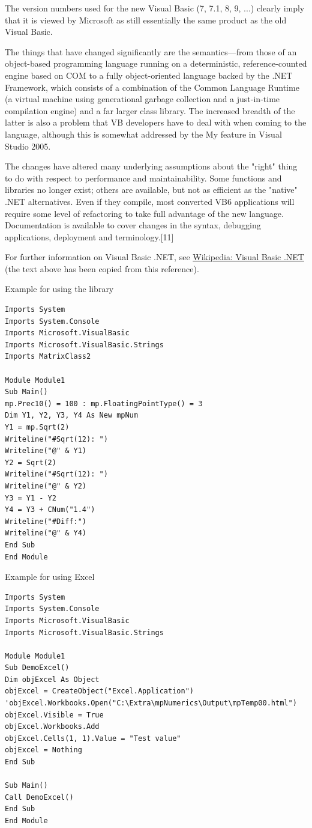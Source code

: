\vpara
The version numbers used for the new Visual Basic (7, 7.1, 8, 9, ...) clearly imply that it is viewed by Microsoft as still essentially the same product as the old Visual Basic.

\vpara
The things that have changed significantly are the semantics—from those of an object-based programming language running on a deterministic, reference-counted engine based on COM to a fully object-oriented language backed by the .NET Framework, which consists of a combination of the Common Language Runtime (a virtual machine using generational garbage collection and a just-in-time compilation engine) and a far larger class library. The increased breadth of the latter is also a problem that VB developers have to deal with when coming to the language, although this is somewhat addressed by the My feature in Visual Studio 2005.

\vpara
The changes have altered many underlying assumptions about the "right" thing to do with respect to performance and maintainability. Some functions and libraries no longer exist; others are available, but not as efficient as the "native" .NET alternatives. Even if they compile, most converted VB6 applications will require some level of refactoring to take full advantage of the new language. Documentation is available to cover changes in the syntax, debugging applications, deployment and terminology.[11]

\vpara
For further information on Visual Basic .NET, see \href{http://en.wikipedia.org/wiki/Visual_Basic_.NET}{Wikipedia: Visual Basic .NET} (the text above has been copied from this reference).


\vpara
Example for using the library


\begin{lstlisting}
Imports System
Imports System.Console
Imports Microsoft.VisualBasic
Imports Microsoft.VisualBasic.Strings
Imports MatrixClass2

Module Module1
Sub Main()
mp.Prec10() = 100 : mp.FloatingPointType() = 3
Dim Y1, Y2, Y3, Y4 As New mpNum
Y1 = mp.Sqrt(2)
Writeline("#Sqrt(12): ")
Writeline("@" & Y1)
Y2 = Sqrt(2)
Writeline("#Sqrt(12): ")
Writeline("@" & Y2)
Y3 = Y1 - Y2
Y4 = Y3 + CNum("1.4")
Writeline("#Diff:")
Writeline("@" & Y4)
End Sub
End Module
\end{lstlisting}


\vpara
Example for using Excel

\begin{lstlisting}
Imports System
Imports System.Console
Imports Microsoft.VisualBasic
Imports Microsoft.VisualBasic.Strings

Module Module1
Sub DemoExcel()
Dim objExcel As Object
objExcel = CreateObject("Excel.Application")
'objExcel.Workbooks.Open("C:\Extra\mpNumerics\Output\mpTemp00.html")
objExcel.Visible = True
objExcel.Workbooks.Add
objExcel.Cells(1, 1).Value = "Test value"
objExcel = Nothing
End Sub

Sub Main()
Call DemoExcel()
End Sub
End Module
\end{lstlisting}




